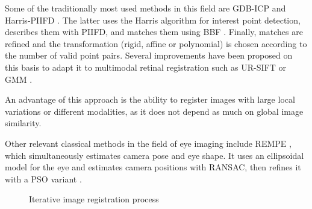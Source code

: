 Some of the traditionally most used methods in this field are \gls{GDB-ICP} \cite{GDB-ICP} and Harris-PIIFD \cite{piifd}. The latter uses the Harris algorithm \cite{Harris1988ACC} for interest point detection, describes them with \gls{PIIFD}, and matches them using \gls{BBF} \cite{BBF}.
Finally, matches are refined and the transformation (rigid, affine or polynomial) is chosen according to the number of valid point pairs. Several improvements have been proposed on this basis to adapt it to multimodal retinal registration such as UR-SIFT \cite{ur-sift} or \gls{GMM} \cite{GMM}.

An advantage of this approach is the ability to register images with large local variations or different modalities, as it does not depend as much on global image similarity.

Other relevant classical methods in the field of eye imaging include REMPE \cite{rempe}, which simultaneously estimates camera pose and eye shape. It uses an ellipsoidal model for the eye and estimates camera positions with RANSAC, then refines it with a PSO variant \cite{pso}.

\begin{figure}[tbp]
\centering
{}
\caption{Iterative image registration process}
\label{fig:rexistro_iterativo}
\end{figure}

